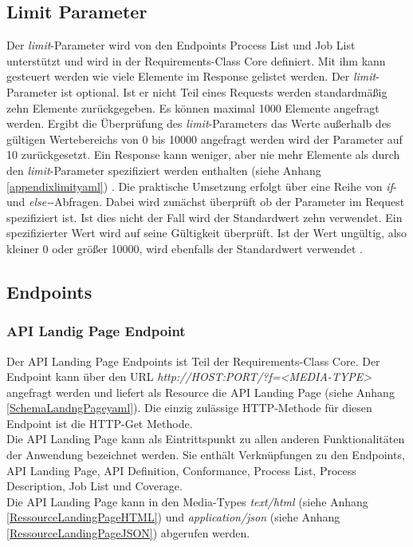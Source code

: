 \subsection{Limit Parameter}
Der \textit{limit}-Parameter wird von den Endpoints Process List und Job List unterstützt
und wird in der Requirements-Class Core definiert. Mit ihm kann gesteuert werden wie viele Elemente im Response gelistet werden. 
Der \textit{limit}-Parameter ist optional. Ist er nicht Teil eines Requests werden standardmäßig zehn Elemente zurückgegeben. Es können maximal 1000 Elemente angefragt werden.
Ergibt die Überprüfung des \textit{limit}-Parameters das Werte außerhalb des gültigen Wertebereichs von 0 bis 10000 angefragt werden wird der Parameter auf 10 zurückgesetzt. 
Ein Response kann weniger, aber nie mehr Elemente als durch den \textit{limit}-Parameter spezifiziert werden enthalten (siehe Anhang \ref{appendixlimityaml}) 
\cite{ogc_api_processes_core}. Die praktische Umsetzung erfolgt über eine Reihe von \textit{if}- und \textit{else-}-Abfragen. Dabei wird zunächst überprüft ob 
der Parameter im Request spezifiziert ist. Ist dies nicht der Fall wird der Standardwert zehn verwendet. Ein spezifizierter Wert wird auf seine Gültigkeit überprüft. 
Ist der Wert ungültig, also kleiner 0 oder größer 10000, wird ebenfalls der Standardwert verwendet \cite{ogc_api_processes_core}.

\subsection{Endpoints}
\subsubsection{API Landig Page Endpoint}
Der API Landing Page Endpoints ist Teil der Requirements-Class Core.
Der Endpoint kann über den URL \textit{http://HOST:PORT/?f=<MEDIA-TYPE>} angefragt werden und liefert als Resource die 
API Landing Page (siehe Anhang \ref{SchemaLandngPageyaml}). 
Die einzig zulässige HTTP-Methode für diesen Endpoint ist die HTTP-Get Methode.\\ 
Die API Landing Page kann als Eintrittspunkt zu allen anderen Funktionalitäten der Anwendung bezeichnet werden. Sie enthält Verknüpfungen zu den Endpoints, 
API Landing Page, API Definition, Conformance, Process List, Process Description, Job List und Coverage.\\
Die API Landing Page kann in den Media-Types \textit{text/html} (siehe Anhang \ref{RessourceLandingPageHTML}) und \textit{application/json} 
(siehe Anhang \ref{RessourceLandingPageJSON}) abgerufen werden. \\


